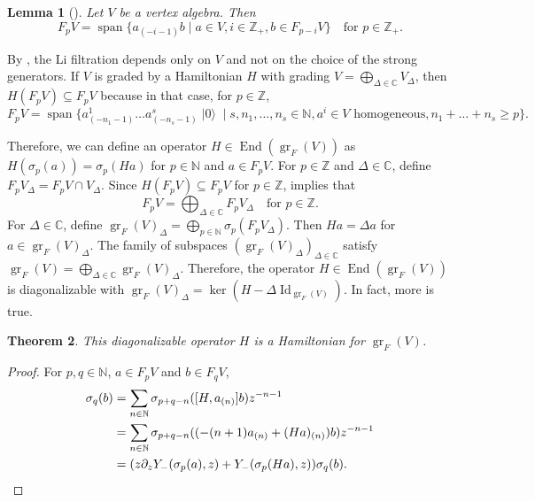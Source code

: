 \documentclass[a4paper, 12pt, reqno]{amsart}
\newtheorem{theorem}{Theorem}[section]
\newtheorem{lemma}[theorem]{Lemma}
\theoremstyle{remark}
\numberwithin{equation}{subsection}
\DeclareMathOperator{\Id}{Id}
\DeclareMathOperator{\gr}{gr}
\DeclareMathOperator{\End}{End}
\DeclareMathOperator{\vspan}{span}
\DeclareMathOperator{\vac}{|0\rangle}
\begin{document}
\begin{lemma}[{\cite[Lemma 2.9]{li_abelianizing_2005}}]
  \label{lmm:18}
  Let $V$ be a vertex algebra.
  Then
  \begin{equation*}
    F_pV = \vspan\{a_{(-i - 1)}b \mid a \in V, i \in \mathbb{Z}_+, b \in F_{p - i}V\} \quad \text{for }p \in \mathbb{Z}_+.
  \end{equation*}
\end{lemma}

By , the Li filtration depends only on $V$ and not on the choice of the strong generators.
If $V$ is graded by a Hamiltonian $H$ with grading $V = \bigoplus_{\Delta \in \mathbb{C}}V_{\Delta}$, then $H(F_pV) \subseteq F_pV$ because in that case, for $p \in \mathbb{Z}$,
\begin{equation*}
F_pV = \vspan \{a^1_{(-n_1 - 1)}\dots a^s_{(-n_s - 1)}\vac \mid s, n_1, \dots, n_s \in \mathbb{N}, a^i \in V\text{ homogeneous}, n_1 + \dots + n_s \ge p\}.
\end{equation*}

Therefore, we can define an operator $H \in \End(\gr_F(V))$ as $H(\sigma_p(a)) = \sigma_p(Ha)$ for $p \in \mathbb{N}$ and $a \in F_pV$.
For $p \in \mathbb{Z}$ and $\Delta \in \mathbb{C}$, define $F_pV_{\Delta} = F_pV \cap V_{\Delta}$.
Since $H(F_pV) \subseteq F_pV$ for $p \in \mathbb{Z}$,  implies that
\begin{equation*}
  F_pV = \bigoplus_{\Delta \in \mathbb{C}}F_pV_{\Delta} \quad \text{for }p \in \mathbb{Z}.
\end{equation*}
For $\Delta \in \mathbb{C}$, define $\gr_F(V)_{\Delta} = \bigoplus_{p \in \mathbb{N}}\sigma_p(F_pV_{\Delta})$.
Then $Ha = \Delta a$ for $a \in \gr_F(V)_{\Delta}$.
The family of subspaces $(\gr_F(V)_{\Delta})_{\Delta \in \mathbb{C}}$ satisfy $\gr_F(V) = \bigoplus_{\Delta \in \mathbb{C}} \gr_F(V)_{\Delta}$.
Therefore, the operator $H \in \End(\gr_F(V))$ is diagonalizable with $\gr_F(V)_{\Delta} = \ker(H - \Delta\Id_{\gr_F(V)})$.
In fact, more is true.

\begin{theorem}
  \label{thr:43}
  This diagonalizable operator $H$ is a Hamiltonian for $\gr_F(V)$.
\end{theorem}

\begin{proof}
  For $p, q \in \mathbb{N}$, $a \in F_pV$ and $b \in F_qV$,
  \begin{align*}
    [H, Y_-(\sigma_p(a), z)]\sigma_q(b) &= \sum_{n \in \mathbb{N}}\sigma_{p + q - n}([H, a_{(n)}]b)z^{-n - 1} \\
    &= \sum_{n \in \mathbb{N}}\sigma_{p + q - n}((-(n + 1)a_{(n)} + (Ha)_{(n)})b)z^{-n - 1} \\
    &= (z\partial_zY_-(\sigma_p(a), z) + Y_-(\sigma_p(Ha), z))\sigma_q(b). \qedhere
  \end{align*}
\end{proof}
\end{document}
